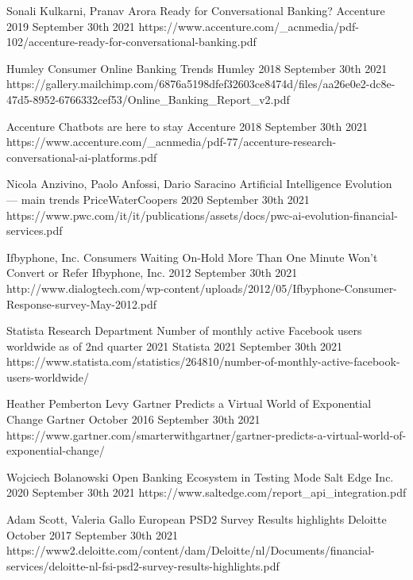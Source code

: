 \begin{thebibliography}{100}
{Sonali Kulkarni, Pranav Arora}
{Ready for Conversational Banking?}
{Accenture}
{2019}
{September 30th 2021}
{https://www.accenture.com/\_acnmedia/pdf-102/accenture-ready-for-conversational-banking.pdf}

{Humley}
{Consumer Online Banking Trends}
{Humley}
{2018}
{September 30th 2021}
{https://gallery.mailchimp.com/6876a5198dfef32603ce8474d/files/aa26e0e2-dc8e-47d5-8952-6766332cef53/Online\_Banking\_Report\_v2.pdf}

{Accenture}
{Chatbots are here to stay}
{Accenture}
{2018}
{September 30th 2021}
{https://www.accenture.com/\_acnmedia/pdf-77/accenture-research-conversational-ai-platforms.pdf}

{Nicola Anzivino, Paolo Anfossi, Dario Saracino}
{Artificial Intelligence Evolution — main trends}
{PriceWaterCoopers}
{2020}
{September 30th 2021}
{https://www.pwc.com/it/it/publications/assets/docs/pwc-ai-evolution-financial-services.pdf}

{Ifbyphone, Inc.}
{Consumers Waiting On-Hold More Than One Minute Won’t Convert or Refer}
{Ifbyphone, Inc.}
{2012}
{September 30th 2021}
{http://www.dialogtech.com/wp-content/uploads/2012/05/Ifbyphone-Consumer-Response-survey-May-2012.pdf}

{Statista Research Department}
{Number of monthly active Facebook users worldwide as of 2nd quarter 2021}
{Statista}
{2021}
{September 30th 2021}
{https://www.statista.com/statistics/264810/number-of-monthly-active-facebook-users-worldwide/}

{Heather Pemberton Levy}
{Gartner Predicts a Virtual World of Exponential Change}
{Gartner}
{October 2016}
{September 30th 2021}
{https://www.gartner.com/smarterwithgartner/gartner-predicts-a-virtual-world-of-exponential-change/}

{Wojciech Bolanowski}
{Open Banking Ecosystem in Testing Mode}
{Salt Edge Inc.}
{2020}
{September 30th 2021}
{https://www.saltedge.com/report\_api\_integration.pdf}

{Adam Scott, Valeria Gallo}
{European PSD2 Survey Results highlights}
{Deloitte}
{October 2017}
{September 30th 2021}
{https://www2.deloitte.com/content/dam/Deloitte/nl/Documents/financial-services/deloitte-nl-fsi-psd2-survey-results-highlights.pdf}

\end{thebibliography}
